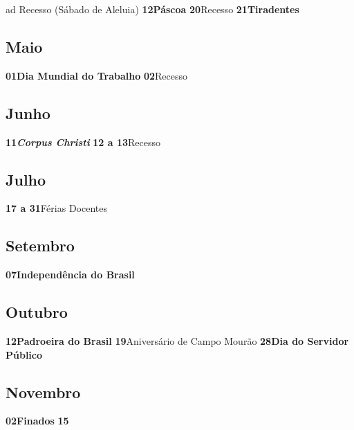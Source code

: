 \documentclass[thesis]{hmcposter}
\begin{document}
\begin{poster}
ad \quad \quad Recesso (Sábado de Aleluia) \newline\textbf{12}\quad \quad \quad \quad \textbf{Páscoa} \newline\textbf{20}\quad \quad \quad \quad Recesso \newline\textbf{21}\quad \quad \quad \quad \textbf{Tiradentes} \newline\subsection{Maio}\textbf{01}\quad \quad \quad \quad \textbf{Dia Mundial do Trabalho} \newline\textbf{02}\quad \quad \quad \quad Recesso \newline\subsection{Junho}\textbf{11}\quad \quad \quad \quad \textbf{\textit{Corpus Christi}} \newline\textbf{12 a 13}\quad \quad Recesso \newline\subsection{Julho}\textbf{17 a 31}\quad \quad Férias Docentes \newline\subsection{Setembro}\textbf{07}\quad \quad \quad \quad \textbf{Independência do Brasil} \newline\subsection{Outubro}\textbf{12}\quad \quad \quad \quad \textbf{Padroeira do Brasil} \newline\textbf{19}\quad \quad \quad \quad Aniversário de Campo Mourão \newline\textbf{28}\quad \quad \quad \quad \textbf{Dia do Servidor Público} \newline\subsection{Novembro}\textbf{02}\quad \quad \quad \quad \textbf{Finados} \newline\textbf{15}\quad \quad \quad \quad 
\end{poster}
\end{document}
